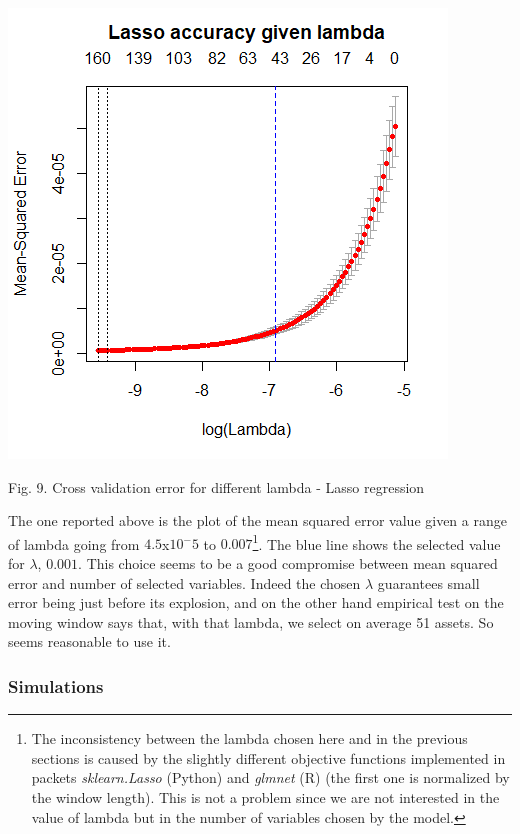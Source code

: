 \documentclass{article}%
\begin{document}
\includegraphics[scale=0.75]{lassoplot}
\begin{center}
\begin{small}
Fig. 9. Cross validation error for different lambda - Lasso regression
\\

\end{small}
\end{center}


The one reported above is the plot of the mean squared error value given a range of lambda going from $4.5$x$10^-5$ to $0.007$\footnote{The inconsistency between the lambda chosen here and in the previous sections is caused by the slightly different objective functions implemented in packets \textit{sklearn.Lasso} (Python) and  \textit{glmnet} (R) (the first one is normalized by the window length). This is not a problem since we are not interested in the value of lambda but in the number of variables chosen by the model.}. The blue line shows the selected value for $\lambda$, $0.001$. This choice seems to be a good compromise between mean squared error and number of selected variables. Indeed the chosen $\lambda$	guarantees small error being just before its explosion, and on the other hand empirical test on the moving window says that, with that lambda, we select on average 51 assets. So seems reasonable to use it. 
\subsubsection{Simulations}
\end{document}

